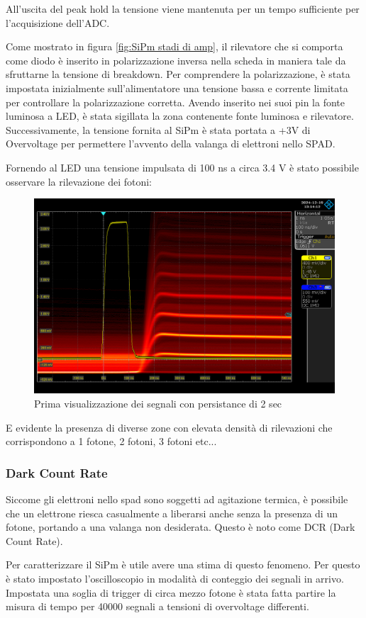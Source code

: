 All'uscita del peak hold la tensione viene mantenuta per un tempo sufficiente per l'acquisizione dell'ADC.

Come mostrato in figura \ref{fig:SiPm stadi di amp}, il rilevatore che si comporta come diodo è inserito in polarizzazione inversa nella scheda in maniera tale da sfruttarne la tensione di breakdown. Per comprendere la polarizzazione, è stata impostata inizialmente sull'alimentatore una tensione bassa e corrente limitata per controllare la polarizzazione corretta. Avendo inserito nei suoi pin la fonte luminosa a LED, è stata sigillata la zona contenente fonte luminosa e rilevatore. Successivamente, la tensione fornita al SiPm è stata portata a +3V di Overvoltage per permettere l'avvento della valanga di elettroni nello SPAD.

Fornendo al LED una tensione impulsata di 100 ns a circa 3.4 V è stato possibile osservare la rilevazione dei fotoni:

\begin{figure}[!h]
    \centering
    \includegraphics[width=0.5\linewidth]{analog/assets/SiPm/SiPm.png}
    \caption{Prima visualizzazione dei segnali con persistance di 2 sec}
\end{figure}

E evidente la presenza di diverse zone con elevata densità di rilevazioni
che corrispondono a 1 fotone, 2 fotoni, 3 fotoni etc...

\subsubsection{Dark Count Rate}
Siccome gli elettroni nello spad sono soggetti ad agitazione termica, è possibile che un elettrone riesca casualmente a liberarsi anche senza la presenza di un fotone, portando a una valanga non desiderata. Questo è noto come DCR (Dark Count Rate).

Per caratterizzare il SiPm è utile avere una stima di questo fenomeno. Per questo è stato impostato l'oscilloscopio in modalità di conteggio dei segnali in arrivo. Impostata una soglia di trigger di circa mezzo fotone è stata fatta partire la misura di tempo per 40000 segnali a tensioni di overvoltage differenti.

